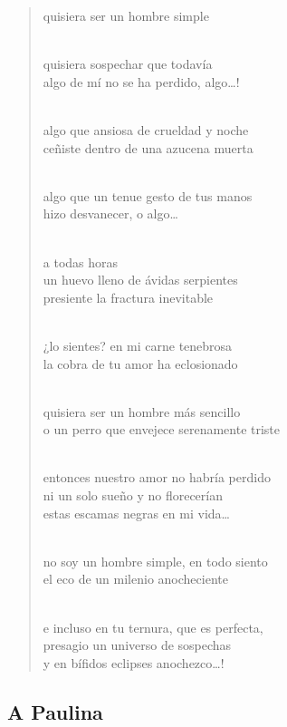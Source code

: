 \documentclass[a4paper, 12pt]{article}
\begin{document}
\begin{verse}
    
quisiera ser un hombre simple\\
~

quisiera sospechar que todavía\\
algo de mí no se ha perdido, algo…!\\
~ 

algo que ansiosa de crueldad y noche\\
ceñiste dentro de una azucena muerta\\
~ 

algo que un tenue gesto de tus manos\\
hizo desvanecer, o algo…\\
~ 

a todas horas\\
un huevo lleno de ávidas serpientes\\
presiente la fractura inevitable\\
~ 

¿lo sientes? en mi carne tenebrosa\\
la cobra de tu amor ha eclosionado\\
~ 

quisiera ser un hombre más sencillo\\
o un perro que envejece serenamente triste\\
~ 

entonces nuestro amor no habría perdido\\
ni un solo sueño y no florecerían\\
estas escamas negras en mi vida…\\
~ 

no soy un hombre simple, en todo siento\\
el eco de un milenio anocheciente\\
~ 

e incluso en tu ternura, que es perfecta,\\
presagio un universo de sospechas\\
y en bífidos eclipses anochezco…!\\

\end{verse}

\pagebreak

\subsection{A Paulina}
\end{document}
